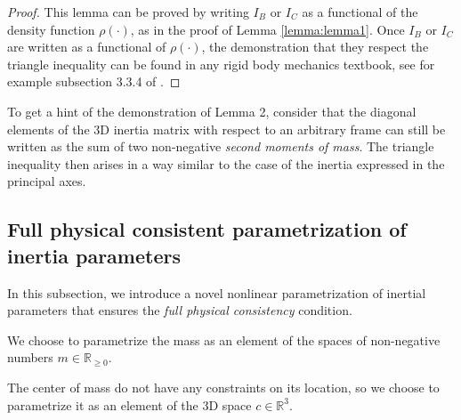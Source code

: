 \begin{proof}
This lemma can be proved by writing $I_B$ or $I_C$ as a functional of the density function $\rho(\cdot)$, as in the proof of Lemma \ref{lemma:lemma1}. Once $I_B$ or $I_C$ are written as a functional of $\rho(\cdot)$, the demonstration that they respect the triangle inequality can be found in any rigid body mechanics textbook,  see for example subsection 3.3.4 of \cite{wittenburg2007dynamics}. 
\end{proof}
To get a hint of the demonstration of Lemma 2, consider that the diagonal elements of the 3D inertia matrix with respect to an arbitrary frame can still be written as the sum of two non-negative  \emph{second moments of mass}. The triangle inequality then arises in a way similar to the case of the inertia expressed in the principal axes.


\subsection{Full physical consistent parametrization of inertia parameters}
In this subsection, we introduce a novel nonlinear parametrization of inertial parameters that ensures the \emph{full physical consistency} condition. 

We choose to parametrize the mass as an element of the spaces of non-negative numbers $m \in \mathbb{R}_{\geq 0}$. 

The center of mass do not have any constraints on its location, so we choose to parametrize it as an element of the 3D space $c \in \mathbb{R}^3$. 